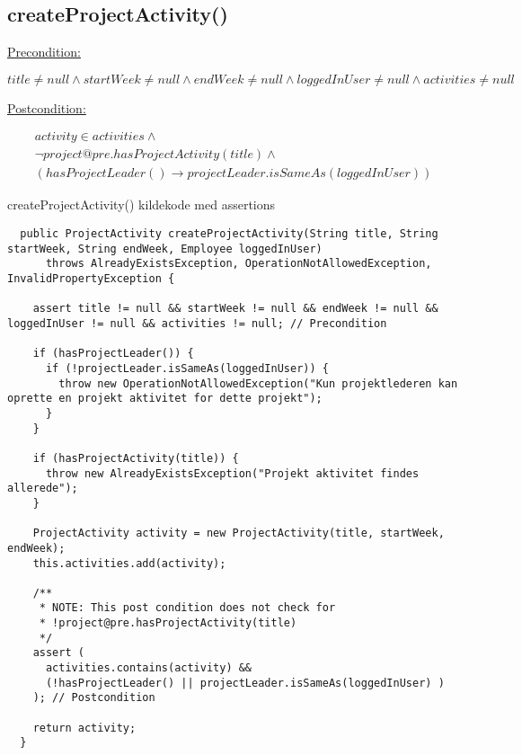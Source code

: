 \subsection{createProjectActivity()} \label{sec:contract_create_project_activity}
\underline{Precondition:}
\vspace{4pt}

\begin{equation}
    title \neq null \wedge startWeek \neq null \wedge endWeek \neq null \wedge loggedInUser \neq null \wedge activities \neq null
\end{equation}
\vspace{4pt}

\noindent
\underline{Postcondition:}
\vspace{4pt}

\begin{equation}
\begin{gathered}
    activity \in activities \wedge \\
    \neg project@pre.hasProjectActivity(title) \wedge \\
    (hasProjectLeader() \to projectLeader.isSameAs(loggedInUser))
\end{gathered}
\end{equation}


\begin{listing}[H]
    \centering
    \caption{createProjectActivity() kildekode med assertions}\label{lst:create_project_activity_assertions}
    \begin{verbatim}
  public ProjectActivity createProjectActivity(String title, String startWeek, String endWeek, Employee loggedInUser)
      throws AlreadyExistsException, OperationNotAllowedException, InvalidPropertyException {

    assert title != null && startWeek != null && endWeek != null && loggedInUser != null && activities != null; // Precondition

    if (hasProjectLeader()) {
      if (!projectLeader.isSameAs(loggedInUser)) {
        throw new OperationNotAllowedException("Kun projektlederen kan oprette en projekt aktivitet for dette projekt");
      }
    }

    if (hasProjectActivity(title)) {
      throw new AlreadyExistsException("Projekt aktivitet findes allerede");
    }

    ProjectActivity activity = new ProjectActivity(title, startWeek, endWeek);
    this.activities.add(activity);

    /**
     * NOTE: This post condition does not check for 
     * !project@pre.hasProjectActivity(title)
     */
    assert (
      activities.contains(activity) &&
      (!hasProjectLeader() || projectLeader.isSameAs(loggedInUser) )
    ); // Postcondition

    return activity;
  }
    \end{verbatim}
\end{listing}


